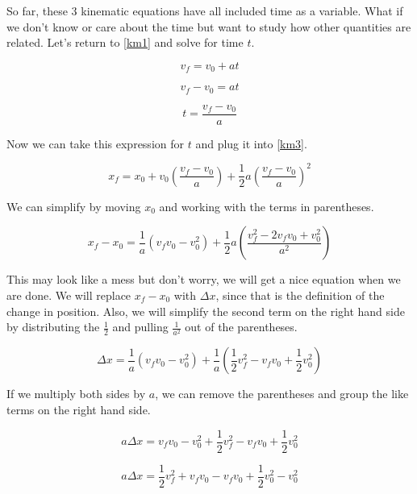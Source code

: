 \documentclass[12pt]{book}
\begin{document}
So far, these 3 kinematic equations have all included time as a variable. What if we don't know or care about the time but want to study how other quantities are related. Let's return to \ref{km1} and solve for time $t$.

\begin{equation}
v_f = v_0 + at
\end{equation}

\begin{equation}
v_f - v_0 = at
\end{equation}

\begin{equation}
t = \frac{v_f - v_0}{a}
\end{equation}

Now we can take this expression for $t$ and plug it into \ref{km3}.

\begin{equation}
x_f = x_0 + v_0 \left( \frac{v_f - v_0}{a} \right) + \frac{1}{2} a \left( \frac{v_f - v_0}{a} \right)^2
\end{equation}

We can simplify by moving $x_0$ and working with the terms in parentheses.

\begin{equation}
x_f - x_0 = \frac{1}{a} (v_f v_0 - v_0^2) + \frac{1}{2}a \left( \frac{v_f^2 - 2 v_f v_0 + v_0^2}{a^2} \right)
\end{equation}

This may look like a mess but don't worry, we will get a nice equation when we are done. We will replace $x_f - x_0$ with $\Delta x$, since that is the definition of the change in position. Also, we will simplify the second term on the right hand side by distributing the $\frac{1}{2}$ and pulling $\frac{1}{a^2}$ out of the parentheses.

\begin{equation}
\Delta x = \frac{1}{a} (v_f v_0 - v_0^2) + \frac{1}{a} (\frac{1}{2} v_f^2 - v_f v_0 + \frac{1}{2} v_0^2)
\end{equation}

If we multiply both sides by $a$, we can remove the parentheses and group the like terms on the right hand side.

\begin{equation}
a \Delta x = v_f v_0 - v_0^2 + \frac{1}{2} v_f^2 - v_f v_0 + \frac{1}{2} v_0^2
\end{equation}

\begin{equation}
a \Delta x = \frac{1}{2} v_f^2 + v_f v_0 - v_f v_0 + \frac{1}{2} v_0^2 - v_0^2
\end{equation}
\end{document}

